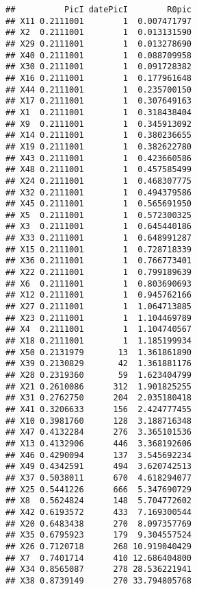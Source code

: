 \documentclass[
]{article}
\begin{document}
\begin{verbatim}
##          PicI datePicI        R0pic
## X11 0.2111001        1  0.007471797
## X2  0.2111001        1  0.013131590
## X29 0.2111001        1  0.013278690
## X40 0.2111001        1  0.088709958
## X30 0.2111001        1  0.091728382
## X16 0.2111001        1  0.177961648
## X44 0.2111001        1  0.235700150
## X17 0.2111001        1  0.307649163
## X1  0.2111001        1  0.318438404
## X9  0.2111001        1  0.345913092
## X14 0.2111001        1  0.380236655
## X19 0.2111001        1  0.382622780
## X43 0.2111001        1  0.423660586
## X48 0.2111001        1  0.457585499
## X24 0.2111001        1  0.468307775
## X32 0.2111001        1  0.494379586
## X45 0.2111001        1  0.565691950
## X5  0.2111001        1  0.572300325
## X3  0.2111001        1  0.645440186
## X33 0.2111001        1  0.648991287
## X15 0.2111001        1  0.728718339
## X36 0.2111001        1  0.766773401
## X22 0.2111001        1  0.799189639
## X6  0.2111001        1  0.803690693
## X12 0.2111001        1  0.945762166
## X27 0.2111001        1  1.064713885
## X23 0.2111001        1  1.104469789
## X4  0.2111001        1  1.104740567
## X18 0.2111001        1  1.185199934
## X50 0.2131979       13  1.361861890
## X39 0.2130829       42  1.361881176
## X28 0.2319360       59  1.623404799
## X21 0.2610086      312  1.901825255
## X31 0.2762750      204  2.035180418
## X41 0.3206633      156  2.424777455
## X10 0.3981760      128  3.188716348
## X47 0.4132284      276  3.365101536
## X13 0.4132906      446  3.368192606
## X46 0.4290094      137  3.545692234
## X49 0.4342591      494  3.620742513
## X37 0.5038011      670  4.618294077
## X25 0.5441226      666  5.347690729
## X8  0.5624824      148  5.704772602
## X42 0.6193572      433  7.169300544
## X20 0.6483438      270  8.097357769
## X35 0.6795923      179  9.304557524
## X26 0.7120718      268 10.919040429
## X7  0.7401714      410 12.686404800
## X34 0.8565087      278 28.536221941
## X38 0.8739149      270 33.794805768
\end{verbatim}
\end{document}
